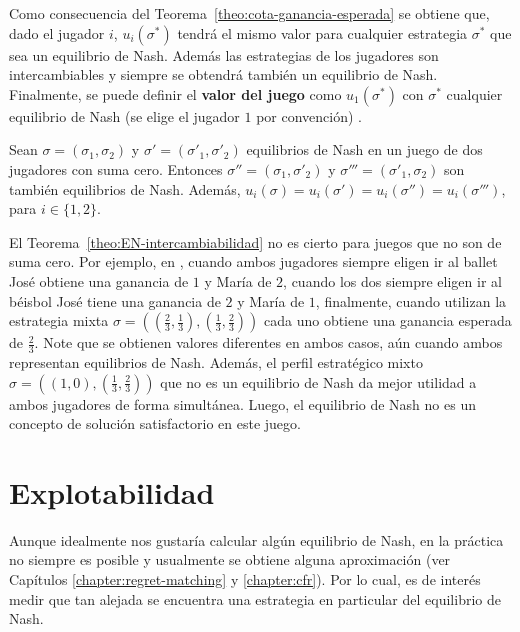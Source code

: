 Como consecuencia del Teorema~\ref{theo:cota-ganancia-esperada} se obtiene que, dado el jugador $i$, $u_i(\sigma^*)$ tendrá el mismo valor para cualquier estrategia $\sigma^*$ que sea un equilibrio de Nash. Además las estrategias de los jugadores son intercambiables y siempre se obtendrá también un equilibrio de Nash. Finalmente, se puede definir el \textbf{valor del juego} \cite[p.~17]{bib:handbook-blai} como $u_1(\sigma^*)$ con $\sigma^*$ cualquier equilibrio de Nash (se elige el jugador $1$ por convención) .

\begin{theorem}
\label{theo:EN-intercambiabilidad}
Sean $\sigma = (\sigma_1, \sigma_2)$ y $\sigma' = (\sigma'_1, \sigma'_2)$ equilibrios de Nash en un juego de dos jugadores con suma cero. Entonces $\sigma'' = (\sigma_1, \sigma'_2)$ y $\sigma''' = (\sigma'_1, \sigma_2)$ son también equilibrios de Nash. Además, $u_i(\sigma) = u_i(\sigma') = u_i(\sigma'') = u_i(\sigma''')$, para $i \in \{1, 2\}$.
\end{theorem}

El Teorema~\ref{theo:EN-intercambiabilidad} no es cierto para juegos que no son de suma cero. Por ejemplo, en , cuando ambos jugadores siempre eligen ir al ballet José obtiene una ganancia de $1$ y María de $2$, cuando los dos siempre eligen ir al béisbol José tiene una ganancia de $2$ y María de $1$, finalmente, cuando utilizan la estrategia mixta $\sigma = \left(\left(\frac{2}{3}, \frac{1}{3}\right), \left(\frac{1}{3}, \frac{2}{3}\right)\right)$ cada uno obtiene una ganancia esperada de $\frac{2}{3}$. Note que se obtienen valores diferentes en ambos casos, aún cuando ambos representan equilibrios de Nash. Además, el perfil estratégico mixto $\sigma = \left((1, 0), \left(\frac{1}{3}, \frac{2}{3}\right)\right)$ que no es un equilibrio de Nash da mejor utilidad a ambos jugadores de forma simultánea. Luego, el equilibrio de Nash no es un concepto de solución satisfactorio en este juego.

\section{Explotabilidad}
\label{section:explotabilidad}

Aunque idealmente nos gustaría calcular algún equilibrio de Nash, en la práctica no siempre es posible y usualmente se obtiene alguna aproximación (ver Capítulos \ref{chapter:regret-matching} y \ref{chapter:cfr}). Por lo cual, es de interés medir que tan alejada se encuentra una estrategia en particular del equilibrio de Nash.

